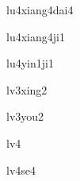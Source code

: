 \begin{multicols}{2}
\begin{verbete}[录像带]{lu4xiang4dai4}
\end{verbete}

\begin{verbete}[录像机]{lu4xiang4ji1}
\end{verbete}

\begin{verbete}[录音机]{lu4yin1ji1}
\end{verbete}

\begin{verbete}[旅行]{lv3xing2}
\end{verbete}

\begin{verbete}[旅游]{lv3you2}
\end{verbete}

\begin{verbete}[绿]{lv4}
\end{verbete}

\begin{verbete}[绿色]{lv4se4}
\end{verbete}

\end{multicols}
